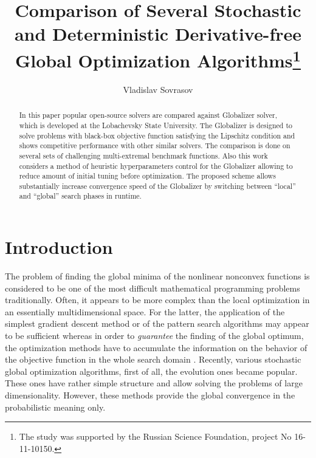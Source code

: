 \documentclass[runningheads]{llncs}
\begin{document}
%
\title{Comparison of Several Stochastic and Deterministic Derivative-free Global Optimization Algorithms\thanks{The study was supported by the Russian Science Foundation, project No 16-11-10150.}}
%
%
\author{Vladislav Sovrasov}
%
%
%
\maketitle              %
%

\begin{abstract}
In this paper popular open-source solvers are compared against
Globalizer solver, which is developed at the Lobachevsky State University.
The Globalizer is designed to solve problems with black-box objective function satisfying the Lipschitz condition and shows
competitive performance with other similar solvers. The comparison is done on several sets of
challenging multi-extremal benchmark functions. Also this work considers a method of
heuristic hyperparameters control for the Globalizer allowing to reduce amount of
initial tuning before optimization. The proposed scheme allows substantially increase convergence speed
of the Globalizer by switching between ``local'' and ``global'' search phases in runtime.
\end{abstract}
%
\section{Introduction}

The problem of finding the global minima of the nonlinear nonconvex functions is considered to be
one of the most difficult mathematical programming problems traditionally. Often, it appears to be
more complex than the local optimization in an essentially multidimensional space.
For the latter, the application of the simplest gradient descent method or of the pattern search
algorithms may appear to be sufficient \cite{torczon1997}
whereas in order to \textit{guarantee} the finding of the global optimum, the optimization methods
have to
accumulate the information on the behavior of the objective function in the whole search domain
\cite{Jones2009,Paulavicius2011,Evtushenko2013,strSergGO}.
Recently, various stochastic global optimization algorithms, first of all, the evolution ones
\cite{Storn1997, SCHLUTER2009, KennedyEberhart1995} became popular. These ones have rather
simple structure and allow solving the problems of large dimensionality. However, these methods
provide the global convergence in the probabilistic meaning only.
\end{document}
